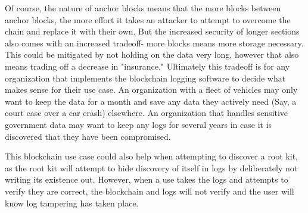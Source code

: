 Of course, the nature of anchor blocks means that the more blocks between anchor blocks, the more effort it takes an attacker to attempt to overcome the chain and replace it with their own. But the increased security of longer sections also comes with an increased tradeoff- more blocks means more storage necessary. This could be mitigated by not holding on the data very long, however that also means trading off a decrease in "insurance." Ultimately this tradeoff is for any organization that implements the blockchain logging software to decide what makes sense for their use case. An organization with a fleet of vehicles may only want to keep the data for a month and save any data they actively need (Say, a court case over a car crash) elsewhere. An organization that handles sensitive government data may want to keep any logs for several years in case it is discovered that they have been compromised. 

This blockchain use case could also help when attempting to discover a root kit, as the root kit will attempt to hide discovery of itself in logs by deliberately not writing its existence out. However, when a use takes the logs and attempts to verify they are correct, the blockchain and logs will not verify and the user will know log tampering has taken place.

